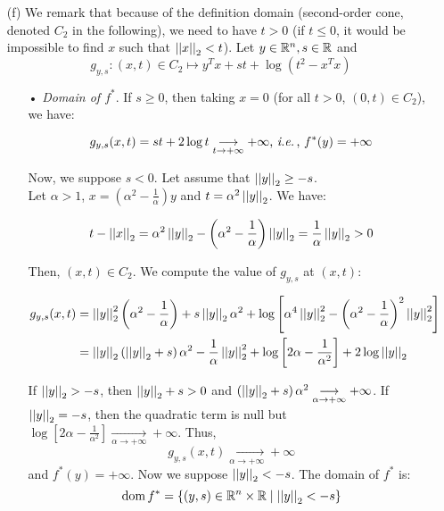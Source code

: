 \documentclass[a4paper, 11pt]{report}
\begin{document}
\begin{itemize}
    \item[(f)] We remark that because of the definition domain (second-order cone, denoted $C_{2}$ in the following), we need to have $t > 0$ (if $t \leq 0$, it would be impossible to find $x$ such that $\left|\left| x \right|\right|_{2} < t$). Let $y \in \mathbb{R}^{n}, s \in \mathbb{R}$ and
    \[ g_{y, s}: (x, t) \in C_{2} \longmapsto y^{T}x + st + \log \left( t^{2} - x^{T}x \right) \]
    
    \begin{itemize}
        \item[•] \textit{Domain of $f^{*}$}. If $s \geq 0$, then taking $x = 0$ (for all $t > 0$, $(0, t) \in C_{2}$), we have:
        
        \[ g_{y, s}(x, t) = st + 2 \log t \underset{t \rightarrow + \infty}{\longrightarrow} + \infty \text{, \textit{i.e.\,}, } f^{*}(y) = + \infty \]
        
        Now, we suppose $s < 0$. Let assume that $\left|\left| y \right|\right|_{2} \geq -s$. \\
        Let $\alpha > 1$, $x = \left( \alpha^{2} - \frac{1}{\alpha} \right) y$ and $t = \alpha^{2} \left|\left| y \right|\right|_{2}$. We have:
        
        \[ t - \left|\left| x \right|\right|_{2} = \alpha^{2} \left|\left| y \right|\right|_{2} - \left( \alpha^{2} - \frac{1}{\alpha} \right) \left|\left| y \right|\right|_{2} = \frac{1}{\alpha} \left|\left| y \right|\right|_{2} > 0 \]
        
        Then, $(x, t) \in C_{2}$. We compute the value of $g_{y, s}$ at $(x, t)$:
        
        \begin{equation*}
            \begin{split}
                g_{y, s}(x, t) &= \left|\left| y \right|\right|_{2}^{2} \left( \alpha^{2} - \frac{1}{\alpha} \right) + s \left|\left| y \right|\right|_{2} \alpha^{2} + \log \left[ \alpha^{4} \left|\left| y \right|\right|_{2}^{2} - \left( \alpha^{2} - \frac{1}{\alpha} \right)^{2} \left|\left| y \right|\right|_{2}^{2} \right] \\
                &= \left|\left| y \right|\right|_{2} \left( \left|\left| y \right|\right|_{2} + s \right) \alpha^{2} - \frac{1}{\alpha} \left|\left| y \right|\right|_{2}^{2} +  \log \left[ 2 \alpha - \frac{1}{\alpha^{2}} \right] + 2 \log \left|\left| y \right|\right|_{2}
            \end{split}
        \end{equation*}
        
        If $\left|\left| y \right|\right|_{2} > -s$, then $\left|\left| y \right|\right|_{2} + s > 0$ and $\left( \left|\left| y \right|\right|_{2} + s \right) \alpha^{2} \underset{\alpha \rightarrow + \infty}{\longrightarrow} + \infty$. If $\left|\left| y \right|\right|_{2} = -s$, then the quadratic term is null but $\log \left[ 2 \alpha - \frac{1}{\alpha^{2}} \right] \underset{\alpha \rightarrow + \infty}{\longrightarrow} + \infty$. Thus,
        \[ g_{y, s}(x, t) \underset{\alpha \rightarrow + \infty}{\longrightarrow} + \infty \] 
        and $f^{*}(y) = + \infty$. Now we suppose $\left|\left| y \right|\right|_{2} < -s$. The domain of $f^{*}$ is: 
        \[ \operatorname{dom} f^{*} = \left\{ \left( y, s \right) \in \mathbb{R}^{n} \times \mathbb{R} \mid \left|\left| y \right|\right|_{2} < -s\right\} \]
        

\end{itemize}
\end{itemize}
\end{document}
